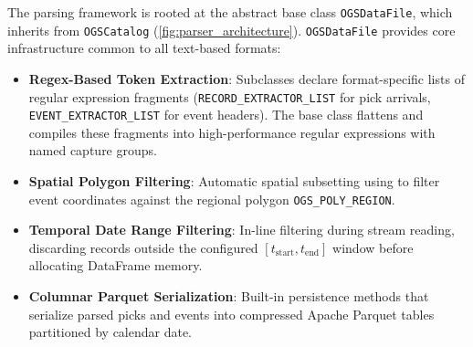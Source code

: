The parsing framework is rooted at the abstract base class
\texttt{OGSDataFile}, which inherits from \texttt{OGSCatalog}
(\cref{fig:parser_architecture}). \texttt{OGSDataFile}
provides core infrastructure common to all text-based formats:
\begin{itemize}
  \item \textbf{Regex-Based Token Extraction}: Subclasses declare
    format-specific lists of regular expression fragments
    (\texttt{RECORD\_EXTRACTOR\_LIST} for pick arrivals,
    \texttt{EVENT\_EXTRACTOR\_LIST} for event headers). The base
    class flattens and compiles these fragments into
    high-performance regular expressions with named capture groups.
  \item \textbf{Spatial Polygon Filtering}: Automatic spatial
    subsetting using 
    to filter event coordinates against the regional polygon
    \texttt{OGS\_POLY\_REGION}.
  \item \textbf{Temporal Date Range Filtering}: In-line filtering
    during stream reading, discarding records outside the configured
    $[t_{\mathrm{start}}, t_{\mathrm{end}}]$ window before
    allocating DataFrame memory.
  \item \textbf{Columnar Parquet Serialization}: Built-in
    persistence methods that serialize parsed picks and events into
    compressed Apache Parquet tables partitioned by calendar date.
\end{itemize}


